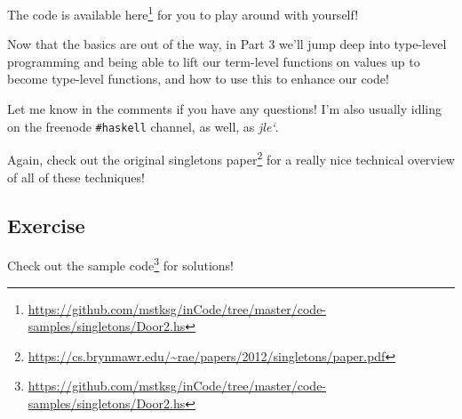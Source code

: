 \documentclass[]{article}
\renewcommand{\href}[2]{#2\footnote{\url{#1}}}
\begin{document}
The code is available
\href{https://github.com/mstksg/inCode/tree/master/code-samples/singletons/Door2.hs}{here}
for you to play around with yourself!

Now that the basics are out of the way, in Part 3 we'll jump deep into
type-level programming and being able to lift our term-level functions on values
up to become type-level functions, and how to use this to enhance our code!

Let me know in the comments if you have any questions! I'm also usually idling
on the freenode \texttt{\#haskell} channel, as well, as \emph{jle`}.

Again, check out the
\href{https://cs.brynmawr.edu/~rae/papers/2012/singletons/paper.pdf}{original
singletons paper} for a really nice technical overview of all of these
techniques!

\subsection{Exercise}\label{exercise}

Check out the
\href{https://github.com/mstksg/inCode/tree/master/code-samples/singletons/Door2.hs}{sample
code} for solutions!
\end{document}
